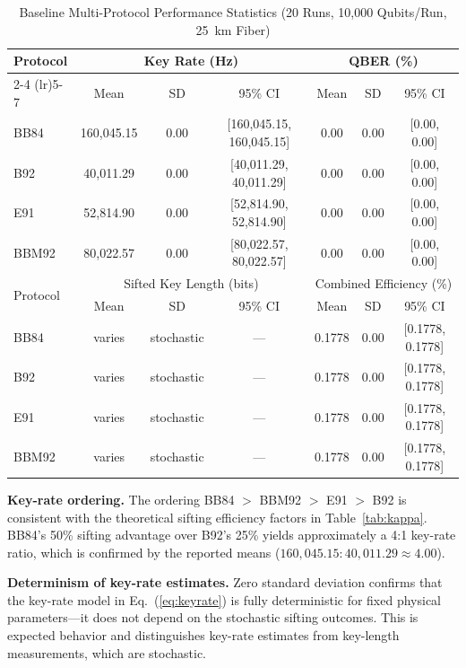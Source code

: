 \documentclass[journal]{IEEEtran}
\begin{document}
\begin{table}[!t]
  \caption{Baseline Multi-Protocol Performance Statistics (20 Runs,
           10,000 Qubits/Run, 25~km Fiber)}
  \label{tab:baseline_stats}
  \centering
  \footnotesize
  \begin{tabular}{lcccccc}
    \toprule
    \multirow{2}{*}{Protocol} &
    \multicolumn{3}{c}{Key Rate (Hz)} &
    \multicolumn{3}{c}{QBER (\%)} \\
    \cmidrule(lr){2-4} \cmidrule(lr){5-7}
    & Mean & SD & 95\% CI & Mean & SD & 95\% CI \\
    \midrule
    BB84  & 160,045.15 & 0.00 & [160,045.15, 160,045.15] & 0.00 & 0.00 & [0.00, 0.00] \\
    B92   & 40,011.29  & 0.00 & [40,011.29, 40,011.29]   & 0.00 & 0.00 & [0.00, 0.00] \\
    E91   & 52,814.90  & 0.00 & [52,814.90, 52,814.90]   & 0.00 & 0.00 & [0.00, 0.00] \\
    BBM92 & 80,022.57  & 0.00 & [80,022.57, 80,022.57]   & 0.00 & 0.00 & [0.00, 0.00] \\
    \midrule
    \multirow{2}{*}{Protocol} &
    \multicolumn{3}{c}{Sifted Key Length (bits)} &
    \multicolumn{3}{c}{Combined Efficiency (\%)} \\
    \cmidrule(lr){2-4} \cmidrule(lr){5-7}
    & Mean & SD & 95\% CI & Mean & SD & 95\% CI \\
    \midrule
    BB84  & varies & stochastic & --- & 0.1778 & 0.00 & [0.1778, 0.1778] \\
    B92   & varies & stochastic & --- & 0.1778 & 0.00 & [0.1778, 0.1778] \\
    E91   & varies & stochastic & --- & 0.1778 & 0.00 & [0.1778, 0.1778] \\
    BBM92 & varies & stochastic & --- & 0.1778 & 0.00 & [0.1778, 0.1778] \\
    \bottomrule
  \end{tabular}
\end{table}

\textbf{Key-rate ordering.} The ordering BB84 $>$ BBM92 $>$ E91 $>$ B92
is consistent with the theoretical sifting efficiency factors in
Table~\ref{tab:kappa}. BB84's 50\% sifting advantage over B92's 25\%
yields approximately a 4:1 key-rate ratio, which is confirmed by the
reported means ($160{,}045.15 : 40{,}011.29 \approx 4.00$).

\textbf{Determinism of key-rate estimates.} Zero standard deviation
confirms that the key-rate model in Eq.~(\ref{eq:keyrate}) is fully
deterministic for fixed physical parameters—it does not depend on
the stochastic sifting outcomes. This is expected behavior and
distinguishes key-rate estimates from key-length measurements, which
are stochastic.
\end{document}
